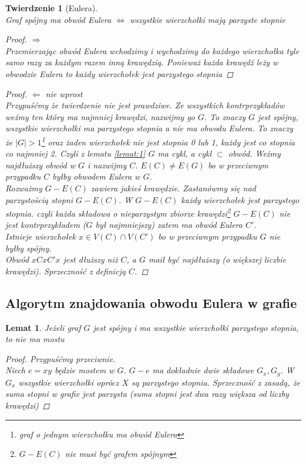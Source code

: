 \documentclass[12pt,a4paper]{article}
\newtheorem{lemat}{Lemat}
\newtheorem{tw}{Twierdzenie}
\theoremstyle{definition}
\begin{document}
\begin{tw}[Eulera]\label{tw:Eulera}~\\
Graf spójny ma obwód Eulera $\Leftrightarrow$ wszystkie wierzchołki mają parzyste stopnie
\begin{proof}
$\Rightarrow$\\
Przemierzając obwód Eulera wchodzimy i wychodzimy do każdego wierzchołka tyle samo razy za każdym razem inną krawędzią. Ponieważ każda krawędź leży w obwodzie Eulera to każdy wierzchołek jest parzystego stopnia
\end{proof}
\begin{proof}
$\Leftarrow$ \emph{nie wprost}\\
Przypuśćmy że twierdzenie nie jest prawdziwe. Ze wszystkich kontrprzykładów weźmy ten który ma najmniej krawędzi, nazwijmy go $G$. To znaczy $G$ jest spójny, wszystkie wierzchołki ma parzystego stopnia a nie ma obwodu Eulera. To znaczy że $|G| > 1$\footnote{graf o jednym wierzchołku ma obwód Eulera} oraz żaden wierzchołek nie jest stopnia 0 lub 1, każdy jest co stopnia co najmniej 2. Czyli z lematu \ref{lemat:1} $G$ ma cykl, a cykl $\subset$ obwód.
Weźmy najdłuższy obwód w $G$ i nazwijmy $C$. $E(C) \neq E(G)$ bo w przeciwnym przypadku $C$ byłby obwodem Eulera w $G$.
\\Rozważmy $G-E(C)$ zawiera jakieś krawędzie. Zastanówmy się nad parzystością stopni $G-E(C)$. W $G-E(C)$ każdy wierzchołek jest parzystego stopnia. czyli każda składowa o nieparzystym zbiorze krawędzi\footnote{$G-E(C)$ nie musi być grafem spójnym} $G-E(C)$ nie jest kontrprzykładem ($G$ był najmniejszy) zatem ma obwód Eulera $C'$.\\
Istnieje wierzchołek $x\in V(C) \cap V(C')$ bo w przeciwnym przypadku $G$ nie byłby spójny.\\
Obwód $xCxC'x$ jest dłuższy niż $C$, a $G$ maił być najdłuższy (o większej liczbie krawędzi). Sprzeczność z definicją $C$.
\end{proof}
\end{tw}

\subsection{Algorytm znajdowania obwodu Eulera w grafie}
\begin{lemat}\label{lemat:2}
Jeżeli graf $G$ jest spójny i ma wszystkie wierzchołki parzystego stopnia, to nie ma mostu
\begin{proof}
Przypuśćmy przeciwnie.\\
Niech $e = xy$ będzie mostem w $G$. $G-e$ ma dokładnie dwie składowe $G_x, G_y$. W $G_x$ wszystkie wierzchołki oprócz $X$ są parzystego stopnia. Sprzeczność z zasadą, że suma stopni w grafie jest parzysta (suma stopni jest dwa razy większa od liczby krawędzi)
\end{proof}
\end{lemat}
\end{document}
